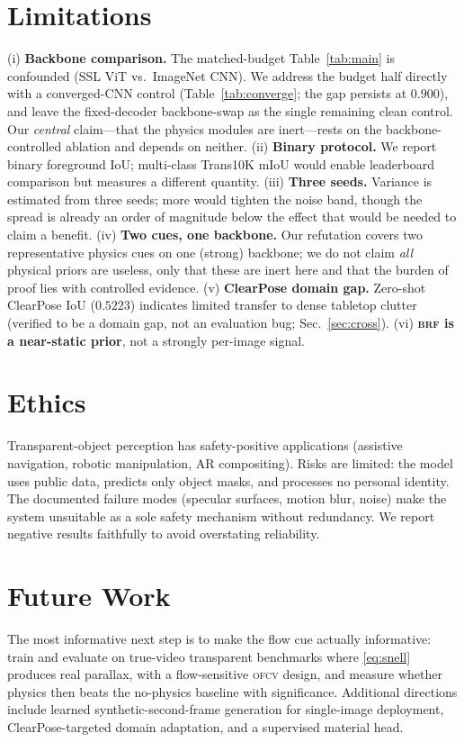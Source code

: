 \documentclass{bmvc2k}
\newcommand{\ofcv}{\textsc{ofcv}}
\newcommand{\brf}{\textsc{brf}}
\newcommand{\iou}{IoU}
\begin{document}
\section{Limitations}
(i) \textbf{Backbone comparison.} The matched-budget Table~\ref{tab:main} is
confounded (SSL ViT vs.\ ImageNet CNN). We address the budget half directly with
a converged-CNN control (Table~\ref{tab:converge}; the gap persists at $0.900$),
and leave the fixed-decoder backbone-swap as the single remaining clean control.
Our \emph{central} claim---that the physics modules are inert---rests on the
backbone-controlled ablation and depends on neither.
(ii) \textbf{Binary protocol.} We report binary foreground \iou; multi-class
Trans10K mIoU would enable leaderboard comparison but measures a different
quantity. (iii) \textbf{Three seeds.} Variance is estimated from three seeds;
more would tighten the noise band, though the spread is already an order of
magnitude below the effect that would be needed to claim a benefit.
(iv) \textbf{Two cues, one backbone.} Our refutation covers two representative
physics cues on one (strong) backbone; we do not claim \emph{all} physical
priors are useless, only that these are inert here and that the burden of proof
lies with controlled evidence. (v) \textbf{ClearPose domain gap.} Zero-shot
ClearPose \iou{} ($0.5223$) indicates limited transfer to dense tabletop
clutter (verified to be a domain gap, not an evaluation bug; Sec.~\ref{sec:cross}).
(vi) \textbf{\brf{} is a near-static prior}, not a strongly per-image signal.

\section{Ethics}
Transparent-object perception has safety-positive applications (assistive
navigation, robotic manipulation, AR compositing). Risks are limited: the model
uses public data, predicts only object masks, and processes no personal
identity. The documented failure modes (specular surfaces, motion blur, noise)
make the system unsuitable as a sole safety mechanism without redundancy. We
report negative results faithfully to avoid overstating reliability.

\section{Future Work}
The most informative next step is to make the flow cue actually informative:
train and evaluate on true-video transparent benchmarks where \eqref{eq:snell}
produces real parallax, with a flow-sensitive \ofcv{} design, and measure
whether physics then beats the no-physics baseline with significance. Additional
directions include learned synthetic-second-frame generation for single-image
deployment, ClearPose-targeted domain adaptation, and a supervised material head.
\end{document}
